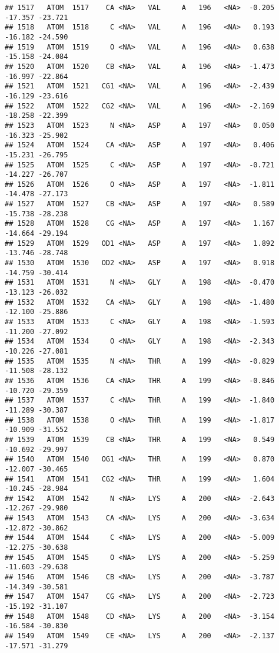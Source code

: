 \documentclass[
]{article}
\begin{document}
\begin{verbatim}
## 1517   ATOM  1517    CA <NA>   VAL     A   196   <NA>  -0.205 -17.357 -23.721
## 1518   ATOM  1518     C <NA>   VAL     A   196   <NA>   0.193 -16.182 -24.590
## 1519   ATOM  1519     O <NA>   VAL     A   196   <NA>   0.638 -15.158 -24.084
## 1520   ATOM  1520    CB <NA>   VAL     A   196   <NA>  -1.473 -16.997 -22.864
## 1521   ATOM  1521   CG1 <NA>   VAL     A   196   <NA>  -2.439 -16.129 -23.616
## 1522   ATOM  1522   CG2 <NA>   VAL     A   196   <NA>  -2.169 -18.258 -22.399
## 1523   ATOM  1523     N <NA>   ASP     A   197   <NA>   0.050 -16.323 -25.902
## 1524   ATOM  1524    CA <NA>   ASP     A   197   <NA>   0.406 -15.231 -26.795
## 1525   ATOM  1525     C <NA>   ASP     A   197   <NA>  -0.721 -14.227 -26.707
## 1526   ATOM  1526     O <NA>   ASP     A   197   <NA>  -1.811 -14.478 -27.173
## 1527   ATOM  1527    CB <NA>   ASP     A   197   <NA>   0.589 -15.738 -28.238
## 1528   ATOM  1528    CG <NA>   ASP     A   197   <NA>   1.167 -14.664 -29.194
## 1529   ATOM  1529   OD1 <NA>   ASP     A   197   <NA>   1.892 -13.746 -28.748
## 1530   ATOM  1530   OD2 <NA>   ASP     A   197   <NA>   0.918 -14.759 -30.414
## 1531   ATOM  1531     N <NA>   GLY     A   198   <NA>  -0.470 -13.123 -26.032
## 1532   ATOM  1532    CA <NA>   GLY     A   198   <NA>  -1.480 -12.100 -25.886
## 1533   ATOM  1533     C <NA>   GLY     A   198   <NA>  -1.593 -11.200 -27.092
## 1534   ATOM  1534     O <NA>   GLY     A   198   <NA>  -2.343 -10.226 -27.081
## 1535   ATOM  1535     N <NA>   THR     A   199   <NA>  -0.829 -11.508 -28.132
## 1536   ATOM  1536    CA <NA>   THR     A   199   <NA>  -0.846 -10.720 -29.359
## 1537   ATOM  1537     C <NA>   THR     A   199   <NA>  -1.840 -11.289 -30.387
## 1538   ATOM  1538     O <NA>   THR     A   199   <NA>  -1.817 -10.909 -31.552
## 1539   ATOM  1539    CB <NA>   THR     A   199   <NA>   0.549 -10.692 -29.997
## 1540   ATOM  1540   OG1 <NA>   THR     A   199   <NA>   0.870 -12.007 -30.465
## 1541   ATOM  1541   CG2 <NA>   THR     A   199   <NA>   1.604 -10.245 -28.984
## 1542   ATOM  1542     N <NA>   LYS     A   200   <NA>  -2.643 -12.267 -29.980
## 1543   ATOM  1543    CA <NA>   LYS     A   200   <NA>  -3.634 -12.872 -30.862
## 1544   ATOM  1544     C <NA>   LYS     A   200   <NA>  -5.009 -12.275 -30.638
## 1545   ATOM  1545     O <NA>   LYS     A   200   <NA>  -5.259 -11.603 -29.638
## 1546   ATOM  1546    CB <NA>   LYS     A   200   <NA>  -3.787 -14.349 -30.581
## 1547   ATOM  1547    CG <NA>   LYS     A   200   <NA>  -2.723 -15.192 -31.107
## 1548   ATOM  1548    CD <NA>   LYS     A   200   <NA>  -3.154 -16.584 -30.830
## 1549   ATOM  1549    CE <NA>   LYS     A   200   <NA>  -2.137 -17.571 -31.279

\end{verbatim}
\end{document}
